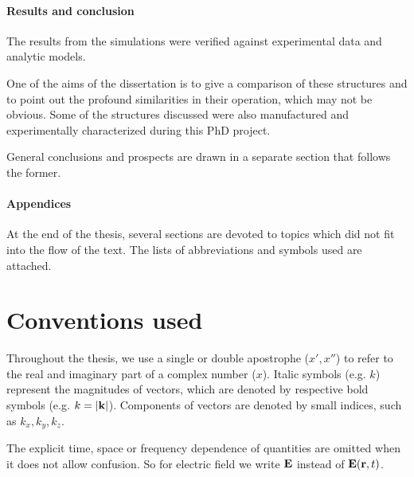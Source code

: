 \paragraph{Results and conclusion} %

The results from the simulations were verified against experimental data and analytic models.

One of the aims of the dissertation is to give a comparison of these structures and to point out the profound similarities in their operation, which may not be obvious.  Some of the structures discussed were also manufactured and experimentally characterized during this PhD project. 

General conclusions and prospects are drawn in a separate section that follows the former.
\paragraph{Appendices} %
At the end of the thesis, several sections are devoted to topics which did not fit into the flow of the text. 
The lists of abbreviations and symbols used are attached.


\section{Conventions used}%
Throughout the thesis, we use a single or double apostrophe ($x', x''$) to refer to the real and imaginary part of a complex number ($x$). Italic symbols (e.g. $k$) represent the magnitudes of vectors, which are denoted by respective bold symbols (e.g. $k = |{\mathbf{k}}|$). Components of vectors are denoted by small indices, such as $k_x, k_y, k_z$. 

The explicit time, space or frequency dependence of quantities are omitted when it does not allow confusion. So for electric field we write $\mathbf{E}$ instead of $\mathbf{E}({\mathbf{r}},t)$.

